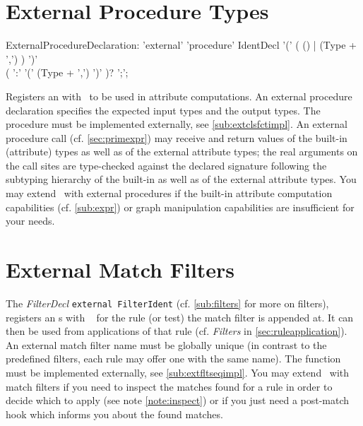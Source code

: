 \section{External Procedure Types}\label{sub:extproc}
\begin{rail}
  ExternalProcedureDeclaration: 'external' 'procedure' IdentDecl '(' ( () | (Type + ',') ) ')' \\ ( ':' '(' (Type + ',') ')' )? ';';
\end{rail}
Registers an  with \GrG~to be used in attribute computations.
An external procedure declaration specifies the expected input types and the output types. The procedure must be implemented externally, see \ref{sub:extclsfctimpl}.
An external procedure call (cf. \ref{sec:primexpr}) may receive and return values of the built-in (attribute) types as well as of the external attribute types; the real arguments on the call sites are type-checked against the declared signature following the subtyping hierarchy of the built-in as well as of the external attribute types.
You may extend \GrG~with external procedures if the built-in attribute computation capabilities (cf. \ref{sub:expr}) or graph manipulation capabilities are insufficient for your needs.

\section{External Match Filters}\label{sub:extflt}

The \emph{FilterDecl} \texttt{external FilterIdent} (cf. \ref{sub:filters} for more on filters), 
registers an s with \GrG~ for the rule (or test) the match filter is appended at.
It can then be used from applications of that rule (cf. \emph{Filters} in \ref{sec:ruleapplication}).
An external match filter name must be globally unique (in contrast to the predefined filters, each rule may offer one with the same name).
The  function must be implemented externally, see \ref{sub:extfltseqimpl}.
You may extend \GrG~with match filters if you need to inspect the matches found for a rule in order to decide which to apply (see note \ref{note:inspect}) or if you just need a post-match hook which informs you about the found matches.

